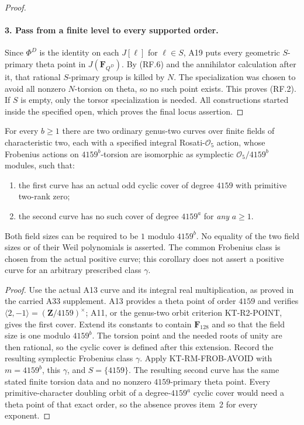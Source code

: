 \begin{proof}
\paragraph{3. Pass from a finite level to every supported order.}
Since $\Phi^D$ is the identity on each $J[\ell]$ for
$\ell\in S$, A19 puts every geometric $S$-primary theta point
in $J(\mathbf F_{Q^D})$.  By (RF.6) and the annihilator
calculation after it, that rational $S$-primary group is killed
by $N$.  The specialization was chosen to avoid all nonzero
$N$-torsion on theta, so no such point exists.  This proves
(RF.2).  If $S$ is empty, only the torsor specialization is
needed.  All constructions started inside the specified open,
which proves the final locus assertion.
\end{proof}

\begin{corollary}
For every $b\geq1$ there are two ordinary genus-two curves over
finite fields of characteristic two, each with a specified
integral Rosati-$\mathcal O_5$ action, whose Frobenius actions
on $4159^b$-torsion are isomorphic as symplectic
$\mathcal O_5/4159^b$ modules, such that:
\begin{enumerate}
\item the first curve has an actual odd cyclic cover of degree
      $4159$ with primitive two-rank zero;
\item the second curve has no such cover of degree $4159^a$
      for \emph{any} $a\geq1$.
\end{enumerate}
Both field sizes can be required to be $1$ modulo $4159^b$.
No equality of the two field sizes or of their Weil polynomials
is asserted.  The common Frobenius class is chosen from the
actual positive curve; this corollary does not assert a positive
curve for an arbitrary prescribed class $\gamma$.
\end{corollary}
\begin{proof}
Use the actual A13 curve and its integral real multiplication,
as proved in the carried A33 supplement.  A13 provides a theta
point of order $4159$ and verifies
$\langle2,-1\rangle=(\mathbf Z/4159)^\times$; A11, or the
genus-two orbit criterion KT-R2-POINT, gives the first cover.
Extend its constants to contain $\mathbf F_{128}$ and so
that the field size is one modulo $4159^b$.  The torsion
point and the needed roots of unity are then rational, so
the cyclic cover is defined after this extension.  Record
the resulting symplectic Frobenius class $\gamma$.
Apply KT-RM-FROB-AVOID with $m=4159^b$, this $\gamma$, and
$S=\{4159\}$.  The resulting second curve has the same stated
finite torsion data and no nonzero $4159$-primary theta point.
Every primitive-character doubling orbit of a degree-$4159^a$
cyclic cover would need a theta point of that exact order, so
the absence proves item~2 for every exponent.
\end{proof}


